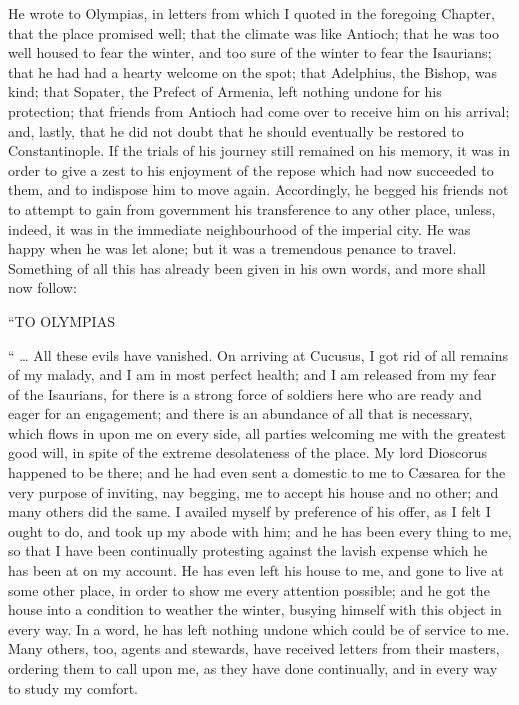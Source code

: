 He wrote to Olympias, in letters from which I quoted in the
foregoing Chapter, that the place promised well; that the climate was
like Antioch; that he was too well housed to fear the winter, and too
sure of the winter to fear the Isaurians; that he had had a hearty
welcome on the spot; that Adelphius, the Bishop, was kind; that Sopater, the Prefect of Armenia, left nothing undone for his
protection; that friends from Antioch had come over to receive him on
his arrival; and, lastly, that he did not doubt that he should
eventually be restored to Constantinople. If the trials of his journey
still remained on his memory, it was in order to give a zest to his
enjoyment of the repose which had now succeeded to them, and to
indispose him to move again. Accordingly, he begged his friends not to
attempt to gain from government his transference to any other place,
unless, indeed, it was in the immediate neighbourhood of the imperial
city. He was happy when he was let alone; but it was a tremendous
penance to travel. Something of all this has already been given in his
own words, and more shall now follow:

``TO
OLYMPIAS

`` … All these evils have vanished. On arriving at Cucusus, I
got rid of all remains of my malady, and I am in most perfect health;
and I am released from my fear of the Isaurians, for there is a strong
force of soldiers here who are ready and eager for an engagement; and
there is an abundance of all that is necessary, which flows in upon me
on every side, all parties welcoming me with the greatest good will,
in spite of the extreme desolateness of the place. My lord Dioscorus
happened to be there; and he had even sent a domestic to me to
Cæsarea for the very purpose of inviting, nay begging, me to accept
his house and no other; and many others did the same. I availed myself
by preference of his offer, as I felt I ought to do, and took up my
abode with him; and he has been every thing to me, so that I have been
continually protesting against the lavish expense which he has been at
on my account. He has even left his house to me, and gone to live at
some other place, in order to show me every attention possible; and he
got the house into a condition to weather the winter, busying himself
with this object in every way. In a word, he has left nothing undone
which could be of service to me. Many others, too, agents and
stewards, have received letters from their masters, ordering
them to call upon me, as they have done continually, and in every way
to study my comfort.

